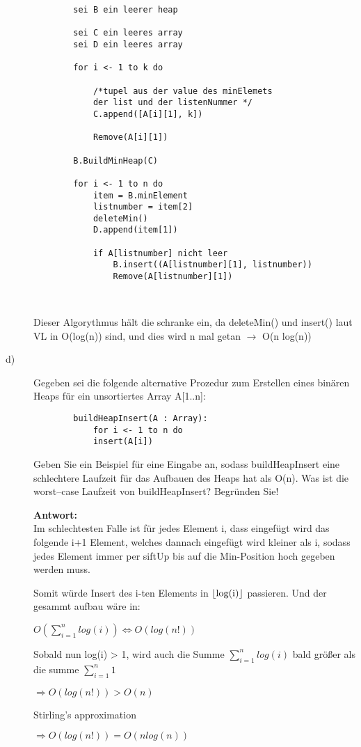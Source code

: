 \documentclass[12pt, a4paper, oneside]{article}
\begin{document}
\begin{description}
\begin{lstlisting}
		sei B ein leerer heap
			
		sei C ein leeres array
		sei D ein leeres array
			
		for i <- 1 to k do
			
			/*tupel aus der value des minElemets 
			der list und der listenNummer */
			C.append([A[i][1], k])
			
			Remove(A[i][1])
			
		B.BuildMinHeap(C)
							
		for i <- 1 to n do
		    item = B.minElement
		    listnumber = item[2]
		    deleteMin()
		    D.append(item[1])
				
		    if A[listnumber] nicht leer
		        B.insert((A[listnumber][1], listnumber))
		        Remove(A[listnumber][1])
				
			
	\end{lstlisting}

	Dieser Algorythmus hält die schranke ein, da deleteMin() und insert() laut VL in O(log(n)) sind, und dies wird n mal getan $\rightarrow$ O(n log(n))
	
	\item[d)] Gegeben sei die folgende alternative Prozedur zum Erstellen eines binären Heaps für
	ein unsortiertes Array A[1..n]:
	\begin{lstlisting}
		buildHeapInsert(A : Array):
		 	for i <- 1 to n do
		 	insert(A[i])
	\end{lstlisting}
	Geben Sie ein Beispiel für eine Eingabe an, sodass buildHeapInsert eine schlechtere
	Laufzeit für das Aufbauen des Heaps hat als O(n). Was ist die worst–case Laufzeit von
	buildHeapInsert? Begründen Sie!
	
	\textbf{Antwort:}\\
	Im schlechtesten Falle ist für jedes Element i, dass eingefügt wird das folgende i+1 Element, welches dannach eingefügt wird kleiner als i, sodass jedes Element immer per siftUp bis auf die Min-Position hoch gegeben werden muss.
	
	Somit würde Insert des i-ten Elements in \(\lfloor$log(i)$\rfloor\) passieren.
	Und der gesammt aufbau wäre in:
	
	\centerline{\(O(\sum^{n}_{i=1}log(i)) \Longleftrightarrow O(log(n!))\)}
	\centerline{   }
	
	Sobald nun log(i) > 1, wird auch die Summe \(\sum^{n}_{i=1}log(i)\) bald größer als die summe \(\sum^{n}_{i=1}1\) 
	
	\centerline{\(\Longrightarrow O(log(n!)) > O(n)\)}
	\centerline{Stirling's approximation}
	\centerline{\(\Longrightarrow O(log(n!)) = O(n log(n))\)}
	
	
\end{description}
	
\end{document}
